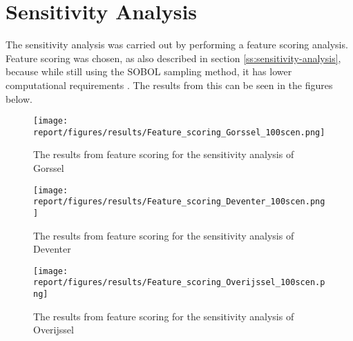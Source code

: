 \section{Sensitivity Analysis}
\label{a:sensitivity-analysis}

The sensitivity analysis was carried out by performing a feature scoring analysis. Feature scoring was chosen, as also described in section \ref{ss:sensitivity-analysis}, because while still using the SOBOL sampling method, it has lower computational requirements \cite{jaxa-rozen_tree-based_2018}. The results from this can be seen in the figures below. 

\begin{figure}[h!]
    \centering
    \texttt{[image: report/figures/results/Feature\_scoring\_Gorssel\_100scen.png]}
    \caption{The results from feature scoring for the sensitivity analysis of Gorssel}
    \label{fig:feat-scor-g}
\end{figure}

\begin{figure}[h!]
    \centering
    \texttt{[image: report/figures/results/Feature\_scoring\_Deventer\_100scen.png]}
    \caption{The results from feature scoring for the sensitivity analysis of Deventer}
    \label{fig:feat-scor-d}
\end{figure}

\begin{figure}[h!]
    \centering
    \texttt{[image: report/figures/results/Feature\_scoring\_Overijssel\_100scen.png]}
    \caption{The results from feature scoring for the sensitivity analysis of Overijssel}
    \label{fig:feat-scor-o}
\end{figure}